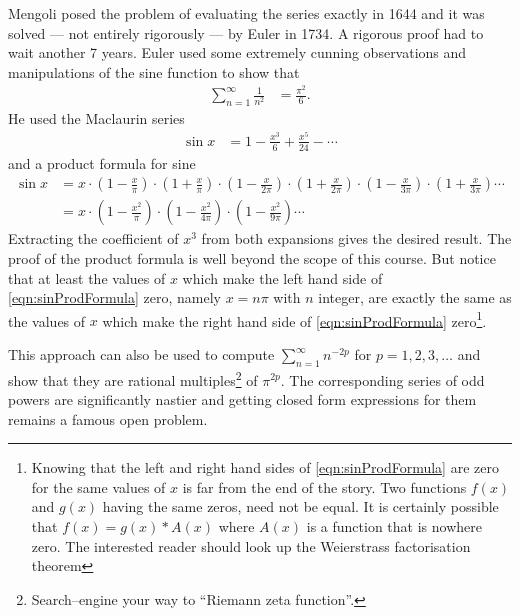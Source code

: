 Mengoli posed the problem of evaluating the series exactly in 1644
and it was solved --- not entirely rigorously --- by Euler in 1734.
A rigorous proof had to wait another 7 years. Euler used some extremely
cunning observations and manipulations of the sine function to show
that
\begin{align*}
  \sum_{n=1}^\infty \frac{1}{n^2} &= \frac{\pi^2}{6}.
\end{align*}
He used the Maclaurin series
\begin{align*}
  \sin x &= 1 - \frac{x^3}{6} + \frac{x^5}{24} - \cdots
\end{align*}
and a product formula for sine
\begin{equation}\label{eqn:sinProdFormula}
\begin{split}
  \sin x &= x
  \cdot \left(1 -\frac{x}{\pi} \right)
  \cdot \left(1 + \frac{x}{\pi} \right)
  \cdot \left(1 -\frac{x}{2\pi} \right)
  \cdot \left(1 + \frac{x}{2\pi} \right)
  \cdot \left(1 -\frac{x}{3\pi} \right)
  \cdot \left(1 + \frac{x}{3\pi} \right)
  \cdots\\
  &= x
  \cdot \left(1 -\frac{x^2}{\pi} \right)
  \cdot \left(1 - \frac{x^2}{4\pi} \right)
  \cdot \left(1 -\frac{x^2}{9\pi} \right)
  \cdots
\end{split}
\end{equation}
Extracting the coefficient of $x^3$ from both expansions gives the desired result. The proof of the product formula is well beyond the scope of
this course. But notice that at least the values of $x$ which make the left hand side of \eqref{eqn:sinProdFormula} zero, namely $x=n\pi$ with $n$
integer, are exactly the same as the values of $x$ which make the
right hand side of  \eqref{eqn:sinProdFormula} zero\footnote{%
Knowing that the left and right hand sides of \eqref{eqn:sinProdFormula}
are zero for the same values of $x$ is far from the end of the story.
Two functions $f(x)$ and $g(x)$ having the same zeros, need not be
equal. It is certainly possible that $f(x)=g(x)*A(x)$ where $A(x)$
is a function that is nowhere zero. The interested reader should look up the Weierstrass factorisation theorem}.

This approach can also be used to compute $\sum_{n=1}^\infty n^{-2p}$ for $p=1,2,3,\dots$ and show that they are rational
multiples\footnote{Search--engine your way to ``Riemann zeta function''.}
of $\pi^{2p}$. The corresponding series of odd powers are significantly nastier and getting closed form expressions for
them remains a famous open problem.


